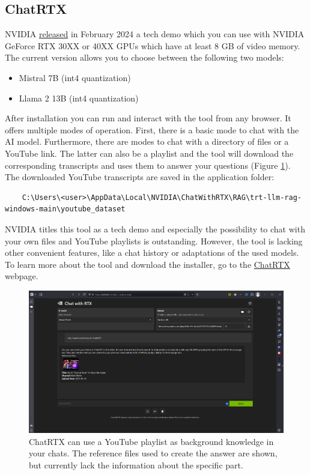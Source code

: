 \documentclass[parskip=half]{scrreprt} %
\begin{document}
\subsection{ChatRTX}
NVIDIA \href{https://blogs.nvidia.com/blog/chat-with-rtx-available-now/}{released} in February 2024 a tech demo which you can use with NVIDIA GeForce RTX 30XX or 40XX GPUs which have at least 8 GB of video memory.
The current version allows you to choose between the following two models:
\begin{itemize}
	\item Mistral 7B (int4 quantization) 
	\item Llama 2 13B (int4 quantization)
\end{itemize}
After installation you can run and interact with the tool from any browser.
It offers multiple modes of operation.
First, there is a basic mode to chat with the AI model.
Furthermore, there are modes to chat with a directory of files or a YouTube link.
The latter can also be a playlist and the tool will download the corresponding transcripts and uses them to answer your questions (Figure \ref{fig:chatrtx}).
The downloaded YouTube transcripts are saved in the application folder:
\begin{lstlisting}
	C:\Users\<user>\AppData\Local\NVIDIA\ChatWithRTX\RAG\trt-llm-rag-windows-main\youtube_dataset
\end{lstlisting}
NVIDIA titles this tool as a tech demo and especially the possibility to chat with your own files and YouTube playlists is outstanding.
However, the tool is lacking other convenient features, like a chat history or adaptations of the used models.
To learn more about the tool and download the installer, go to the \href{https://www.nvidia.com/en-us/ai-on-rtx/chatrtx/}{ChatRTX} webpage.
\begin{figure}[h]
	\includegraphics[width=\textwidth]{ChatRTX}
	\caption{ChatRTX can use a YouTube playlist as background knowledge in your chats.
The reference files used to create the answer are shown, but currently lack the information about the specific part.}
	\centering
	\label{fig:chatrtx}
\end{figure}
\end{document}
